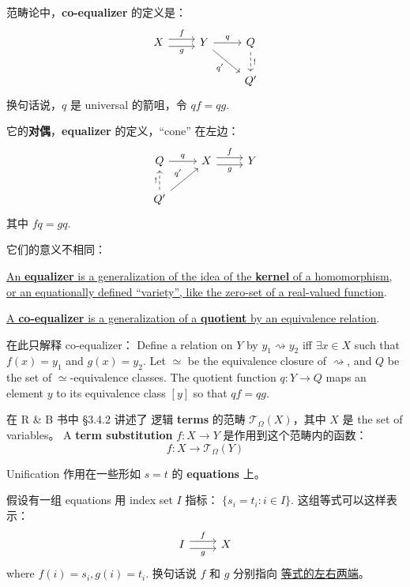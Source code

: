 \documentclass[12pt, orivec]{article}
\begin{document}
范畴论中，\textbf{co-equalizer} 的定义是：
\begin{equation}
\begin{tikzcd}
X \ar[r,shift left=.75ex,"f"]
  \ar[r,shift right=.75ex,swap,"g"]
&
Y \ar[r,"q"] \ar[dr,swap,"q'"]
&
Q \ar[d,densely dashed, "!"]
\\
& & Q'
\end{tikzcd}
\end{equation}
换句话说，$q$ 是 universal 的箭咀，令 $qf = qg$.

它的\textbf{对偶}，\textbf{equalizer} 的定义，``cone'' 在左边：
\begin{equation}
\begin{tikzcd}
Q \ar[r,"q"]
&
X \ar[r,shift left=.75ex,"f"]
  \ar[r,shift right=.75ex,swap,"g"]
&
Y
\\
Q' \ar[ur,"q'"]
   \ar[u,densely dashed, "!"]
 & &
\end{tikzcd}
\end{equation}
其中 $fq = gq$.

它们的意义不相同：

\uline{An \textbf{equalizer} is a generalization of the idea of the \textbf{kernel} of a homomorphism, or an equationally defined ``variety'', like the zero-set of a real-valued function}.

\uline{A \textbf{co-equalizer} is a generalization of a \textbf{quotient} by an equivalence relation}.

在此只解释 co-equalizer：  Define a relation on $Y$ by $y_1 \rightsquigarrow y_2$ iff $\exists x \in X$ such that $f(x) = y_1$ and $g(x) = y_2$.  Let $\simeq$ be the equivalence closure of $\rightsquigarrow$, and $Q$ be the set of $\simeq$-equivalence classes.  The quotient function $q: Y \rightarrow Q$ maps an element $y$ to its equivalence class $[y]$ so that $qf = qg$.

在 R \& B 书中 \S 3.4.2 讲述了 逻辑 \textbf{terms} 的范畴 $\mathcal{T}_{\Omega}(X)$，其中 $X$ 是 the set of variables。  A \textbf{term substitution} $f: X \rightarrow Y$ 是作用到这个范畴内的函数：
\begin{equation}
f: X \rightarrow \mathcal{T}_{\Omega}(Y)
\end{equation}

Unification 作用在一些形如 $s = t$ 的 \textbf{equations} 上。

假设有一组 equations 用 index set $I$ 指标： $\{ s_i = t_i : i \in I \}$.  这组等式可以这样表示：
\begin{equation}
\begin{tikzcd}
I \ar[r,shift left=.75ex,"f"]
  \ar[r,shift right=.75ex,swap,"g"]
& X
\end{tikzcd}
\end{equation}
where $f(i) = s_i, g(i) = t_i$.  换句话说 $f$ 和 $g$ 分别指向 \uline{等式的左右两端}。
\end{document}
